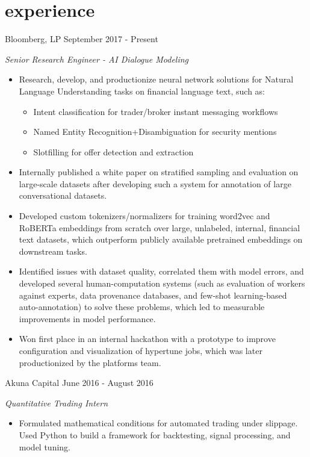 \documentclass[print]{friggeri-cv} %
\begin{document}
\section{experience}

\begin{entrylist}

\entry
{Bloomberg, LP}
{September 2017 - Present}
{\emph{Senior Research Engineer - AI Dialogue Modeling}
\begin{itemize}
\item Research, develop, and productionize neural network solutions for Natural Language Understanding tasks on financial language text, such as:
\begin{itemize}
\item Intent classification for trader/broker instant messaging workflows
\item Named Entity Recognition+Disambiguation for security mentions
\item Slotfilling for offer detection and extraction
\end{itemize}
\item Internally published a white paper on stratified sampling and evaluation on large-scale datasets after developing such a system for annotation of large conversational datasets.
\item Developed custom tokenizers/normalizers for training word2vec and RoBERTa embeddings from scratch over large, unlabeled, internal, financial text datasets, which outperform publicly available pretrained embeddings on downstream tasks.
\item Identified issues with dataset quality, correlated them with model errors, and developed several human-computation systems (such as evaluation of workers against experts, data provenance databases, and few-shot learning-based auto-annotation) to solve these problems, which led to measurable improvements in model performance.
\item Won first place in an internal hackathon with a prototype to improve configuration and visualization of hypertune jobs, which was later productionized by the platforms team.
\end{itemize}}
\entry
{Akuna Capital}
{June 2016 - August 2016}
{\emph{Quantitative Trading Intern}
\begin{itemize}
\item Formulated mathematical conditions for automated trading under slippage. Used Python to build a framework for backtesting, signal processing, and model tuning. 

\end{itemize}}
\end{entrylist}
\end{document}
